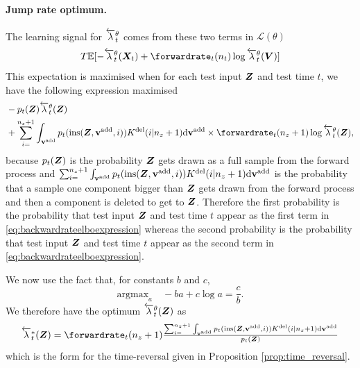 \paragraph{Jump rate optimum.} The learning signal for $\overleftarrow{\lambda}_{t}^\theta$ comes from these two terms in $\mathcal{L}(\theta)$
\begin{equation}
    T \mathbb{E}[ - \backwardrate_t^\theta(\mX_t) + \forwardrate_t(n_t) \log \backwardrate_t^\theta(\mV) ]
    \label{eq:backwardrateelboexpression}
\end{equation}
This expectation is maximised when for each test input ${\bm{Z}}$ and test time $t$, we have the following expression maximised
\begin{align}
  \textstyle 
    &-p_t(\mZ) \backwardrate_t^\theta(\mZ) \\
    &+ \sum_{i=}^{n_z+1} \int_{\yadd} p_t(\text{ins}(\mZ, \yadd, i)) \delidxdist(i | n_z + 1) \rmd \yadd \times \forwardrate_t(n_z + 1) \log \backwardrate_t^\theta(\mZ) , \nonumber 
\end{align}
because $p_t({\bm{Z}})$ is the probability ${\bm{Z}}$ gets drawn as a full sample from the forward process and $\sum_{i=}^{n_z+1} \int_{{\mathbf{v}}^{\textup{add}}} p_t(\text{ins}({\bm{Z}}, {\mathbf{v}}^{\textup{add}}, i)) K^{\textup{del}}(i | n_z + 1) \mathrm{d} {\mathbf{v}}^{\textup{add}} $ is the probability that a sample one component bigger than ${\bm{Z}}$ gets drawn from the forward process and then a component is deleted to get to ${\bm{Z}}$. Therefore the first probability is the probability that test input ${\bm{Z}}$ and test time $t$ appear as the first term in \eqref{eq:backwardrateelboexpression} whereas the second probability is the probability that test input ${\bm{Z}}$ and test time $t$ appear as the second term in \eqref{eq:backwardrateelboexpression}.

We now use the fact that, for constants $b$ and $c$,
\begin{equation}
    \textstyle \mathrm{argmax}_a \quad -ba + c \log a = \frac{c}{b}.
    \label{eq:log_minimizer}
\end{equation}
We therefore have the optimum $\overleftarrow{\lambda}_t^\theta({\bm{Z}})$ as
\begin{equation}
\textstyle    \backwardrate_t^*(\mZ) = \forwardrate_t(n_z + 1) \frac{\sum_{i=}^{n_z+1} \int_{\yadd} p_t(\text{ins}(\mZ, \yadd, i)) \delidxdist(i | n_z + 1) \rmd \yadd}{ p_t(\mZ) }
\end{equation}
which is the form for the time-reversal given in Proposition \eqref{prop:time_reversal}.\\

